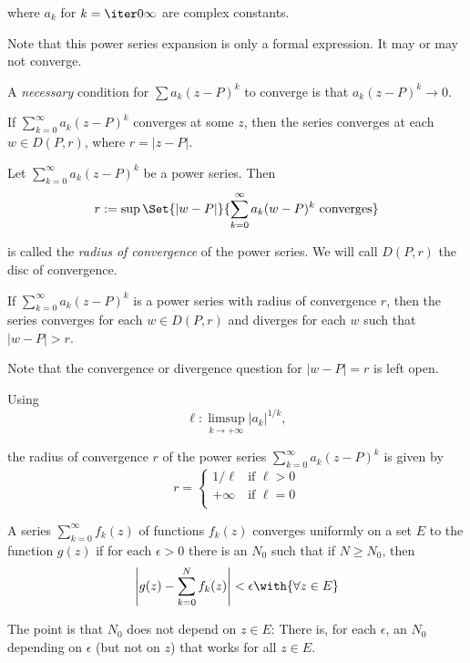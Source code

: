 where $a_k$ for $k=\iter0\infty$ are complex constants.

Note that this power series expansion is only a formal expression. It may or
may not converge.

A \textit{necessary} condition for $\sum a_k(z-P)^k$ to converge is that
$a_k(z-P)^k\to0$.

\label{d5d5bdc}

If $\sum_{k=0}^\infty a_k(z-P)^k$ converges at some $z$, then the series
converges at each $w\in D(P,r)$, where $r=|z-P|$.

\label{da6e337}

Let $\sum_{k=0}^\infty a_k(z-P)^k$ be a power series. Then
$$
  r:=\sup\Set{|w-P|}{\sum_{k=0}^\infty a_k(w-P)^k\text{ converges}}
$$

is called the \textit{radius of convergence} of the power series. We will call
$D(P,r)$ the disc of convergence.

\Lemma{}\label{c7d0e1d}

If $\sum_{k=0}^\infty a_k(z-P)^k$ is a power series with radius of convergence
$r$, then the series converges for each $w\in D(P,r)$ and diverges for each $w$
such that $|w-P|>r$.

Note that the convergence or divergence question for $|w-P|=r$ is left open.

\label{a9ba20f}

Using
$$
  \ell:\limsup_{k\to+\infty}|a_k|^{1/k},
$$

the radius of convergence $r$ of the power series $\sum_{k=0}^\infty
a_k(z-P)^k$ is given by
\begin{equation*}
  r=\begin{cases}
    1/\ell  & \text{if } \ell>0 \\
    +\infty & \text{if } \ell=0 \\
  \end{cases}
\end{equation*}

\label{bba67e4}

A series $\sum_{k=0}^\infty f_k(z)$ of functions $f_k(z)$ converges uniformly
on a set $E$ to the function $g(z)$ if for each $\epsilon>0$ there is an $N_0$
such that if $N\geq N_0$, then
$$
  \left|g(z)-\sum_{k=0}^N f_k(z)\right|<\epsilon\with{\forall z\in E}
$$

The point is that $N_0$ does not depend on $z\in E$: There is, for each
$\epsilon$, an $N_0$ depending on $\epsilon$ (but not on $z$) that works for
all $z\in E$.

